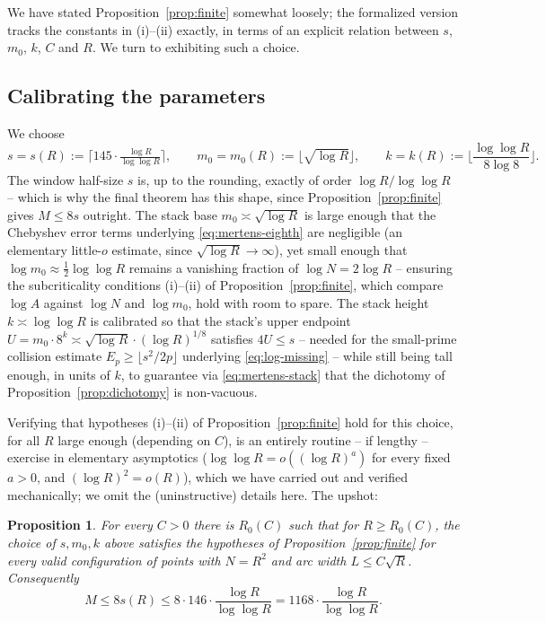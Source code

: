 \documentclass[11pt]{amsart}
\newtheorem{proposition}[theorem]{Proposition}
\theoremstyle{definition}
\theoremstyle{remark}
\begin{document}
We have stated Proposition~\ref{prop:finite} somewhat loosely; the formalized version tracks the constants in (i)--(ii) exactly, in terms of an explicit relation between $s$, $m_0$, $k$, $C$ and $R$. We turn to exhibiting such a choice.

\subsection{Calibrating the parameters}

We choose
\[
s = s(R) := \big\lceil 145\cdot \tfrac{\log R}{\log\log R} \big\rceil, \qquad
m_0 = m_0(R) := \big\lfloor \sqrt{\log R}\big\rfloor, \qquad
k = k(R) := \Big\lfloor \frac{\log\log R}{8\log 8}\Big\rfloor.
\]
The window half-size $s$ is, up to the rounding, exactly of order $\log R/\log\log R$ -- which is why the final theorem has this shape, since Proposition~\ref{prop:finite} gives $M\le 8s$ outright. The stack base $m_0\asymp\sqrt{\log R}$ is large enough that the Chebyshev error terms underlying \eqref{eq:mertens-eighth} are negligible (an elementary little-$o$ estimate, since $\sqrt{\log R}\to\infty$), yet small enough that $\log m_0 \approx \frac12\log\log R$ remains a vanishing fraction of $\log N = 2\log R$ -- ensuring the subcriticality conditions (i)--(ii) of Proposition~\ref{prop:finite}, which compare $\log A$ against $\log N$ and $\log m_0$, hold with room to spare. The stack height $k\asymp\log\log R$ is calibrated so that the stack's upper endpoint $U=m_0\cdot 8^k \asymp \sqrt{\log R}\cdot(\log R)^{1/8}$ satisfies $4U\le s$ -- needed for the small-prime collision estimate $E_p\ge\lfloor s^2/2p\rfloor$ underlying \eqref{eq:log-missing} -- while still being tall enough, in units of $k$, to guarantee via \eqref{eq:mertens-stack} that the dichotomy of Proposition~\ref{prop:dichotomy} is non-vacuous.

Verifying that hypotheses (i)--(ii) of Proposition~\ref{prop:finite} hold for this choice, for all $R$ large enough (depending on $C$), is an entirely routine -- if lengthy -- exercise in elementary asymptotics ($\log\log R = o((\log R)^a)$ for every fixed $a>0$, and $(\log R)^2 = o(R)$), which we have carried out and verified mechanically; we omit the (uninstructive) details here. The upshot:

\begin{proposition}\label{prop:finite-asymp}
For every $C>0$ there is $R_0(C)$ such that for $R\ge R_0(C)$, the choice of $s,m_0,k$ above satisfies the hypotheses of Proposition~\ref{prop:finite} for every valid configuration of points with $N=R^2$ and arc width $L\le C\sqrt R$. Consequently
\[
M \le 8s(R) \le 8\cdot 146\cdot \frac{\log R}{\log\log R} = 1168\cdot\frac{\log R}{\log\log R}.
\]
\end{proposition}
\end{document}
